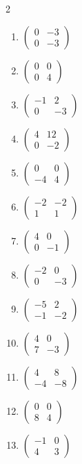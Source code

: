 \begin{multicols}{2}
\begin{enumerate}[label=\arabic*., leftmargin=*]
\item $\begin{pmatrix}0 & -3\\ 0 & -3\end{pmatrix}$
\item $\begin{pmatrix}0 & 0\\ 0 & 4\end{pmatrix}$
\item $\begin{pmatrix}-1 & 2\\ 0 & -3\end{pmatrix}$
\item $\begin{pmatrix}4 & 12\\ 0 & -2\end{pmatrix}$
\item $\begin{pmatrix}0 & 0\\ -4 & 4\end{pmatrix}$
\item $\begin{pmatrix}-2 & -2\\ 1 & 1\end{pmatrix}$
\item $\begin{pmatrix}4 & 0\\ 0 & -1\end{pmatrix}$
\item $\begin{pmatrix}-2 & 0\\ 0 & -3\end{pmatrix}$
\item $\begin{pmatrix}-5 & 2\\ -1 & -2\end{pmatrix}$
\item $\begin{pmatrix}4 & 0\\ 7 & -3\end{pmatrix}$
\item $\begin{pmatrix}4 & 8\\ -4 & -8\end{pmatrix}$
\item $\begin{pmatrix}0 & 0\\ 8 & 4\end{pmatrix}$
\item $\begin{pmatrix}-1 & 0\\ 4 & 3\end{pmatrix}$

\end{enumerate}
\end{multicols}
